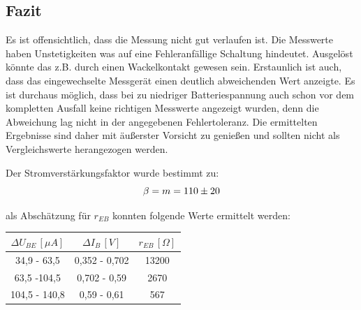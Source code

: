 \subsection{Fazit}
Es ist offensichtlich, dass die Messung nicht gut verlaufen ist. Die Messwerte haben Unstetigkeiten was auf eine Fehleranfällige Schaltung hindeutet. Ausgelöst könnte das z.B. durch einen Wackelkontakt gewesen sein. Erstaunlich ist auch, dass das eingewechselte Messgerät einen deutlich abweichenden Wert anzeigte. Es ist durchaus möglich, dass bei zu niedriger Batteriespannung auch schon vor dem kompletten Ausfall keine richtigen Messwerte angezeigt wurden, denn die Abweichung lag nicht in der angegebenen Fehlertoleranz. Die ermittelten Ergebnisse sind daher mit äußerster Vorsicht zu genießen und sollten nicht als Vergleichswerte herangezogen werden. 

Der Stromverstärkungsfaktor wurde bestimmt zu:
\begin{equation}
\beta = m = 110 \pm 20 \notag
\end{equation}

als Abschätzung für \(r_{EB}\) konnten folgende Werte ermittelt werden:

\begin{center}
\begin{tabular}{c|c|c}
\(\Delta U_{BE}\, [\mu A]\) & \(\Delta I_B\, [V]\) &  \(r_{EB}\, [\Omega]\) \\\hline
34,9 - 63,5 & 0,352 - 0,702 & 13200\\
63,5 -104,5 & 0,702 - 0,59 & 2670\\
104,5 - 140,8 & 0,59 - 0,61 & 567
\end{tabular}
\end{center}